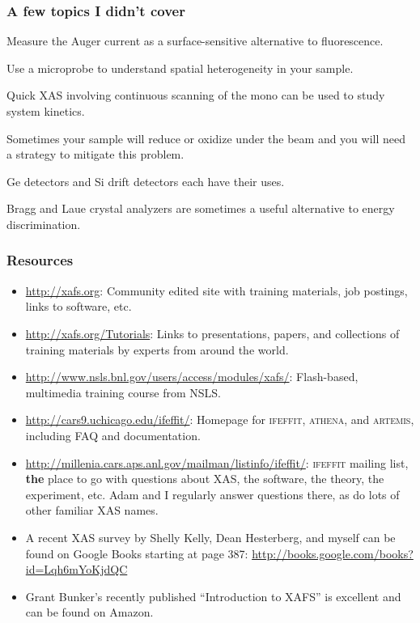 \documentclass[10pt, xcolor=x11names, compress]{beamer}
\begin{document}
\begin{frame}
  \frametitle{A few topics I didn't cover}
  \begin{description}
  \item[Electron yield] Measure the Auger current as a
    surface-sensitive alternative to fluorescence.
  \item[$\mu$XAS] Use a microprobe to understand spatial heterogeneity
    in your sample.
  \item[QXAS] Quick XAS involving continuous scanning of the mono can
    be used to study system kinetics.
  \item[Radiation damage] Sometimes your sample will reduce or oxidize
    under the beam and you will need a strategy to mitigate this
    problem.
  \item[Different kinds of energy discriminating detectors] Ge
    detectors and Si drift detectors each have their uses.
  \item[Wavelength dispersive detection] Bragg and Laue crystal
    analyzers are sometimes a useful alternative to energy
    discrimination.
  \end{description}
\end{frame}

\begin{frame}
  \frametitle{Resources}
  \begin{itemize}
  \item \href{http://xafs.org}{\color{Purple3}http://xafs.org}:
    Community edited site with training materials, job postings, links
    to software, etc.
  \item \href{http://xafs.org/Tutorials}
    {\color{Purple3}http://xafs.org/Tutorials}: Links to
    presentations, papers, and collections of training materials by
    experts from around the world.
  \item \href{http://www.nsls.bnl.gov/users/access/modules/xafs/}
    {\color{Purple3}http://www.nsls.bnl.gov/users/access/modules/xafs/}:
    Flash-based, multimedia training course from NSLS.
  \item \href{http://cars9.uchicago.edu/ifeffit/}
    {\color{Purple3}http://cars9.uchicago.edu/ifeffit/}: Homepage for
    \textsc{ifeffit}, \textsc{athena}, and \textsc{artemis}, including
    FAQ and documentation.
  \item
    \href{http://millenia.cars.aps.anl.gov/mailman/listinfo/ifeffit/}
    {\color{Purple3}http://millenia.cars.aps.anl.gov/mailman/listinfo/ifeffit/}:
    \textsc{ifeffit} mailing list, \textbf{the} place to go with
    questions about XAS, the software, the theory, the experiment,
    etc.  Adam and I regularly answer questions there, as do lots of
    other familiar XAS names.
  \item A recent XAS survey by Shelly Kelly, Dean Hesterberg, and
    myself can be found on Google Books starting at page 387:
    \href{http://books.google.com/books?id=Lqh6mYoKjdQC}
    {\color{Purple3}http://books.google.com/books?id=Lqh6mYoKjdQC}
  \item Grant Bunker's recently published ``Introduction to XAFS'' is
    excellent and can be found on Amazon.
  \end{itemize}
\end{frame}
\end{document}

